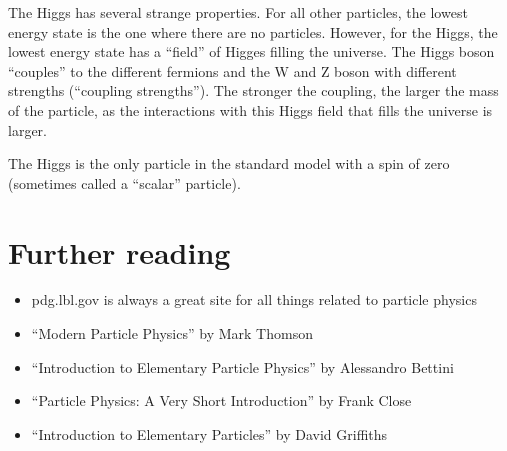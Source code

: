 The Higgs has several strange properties.  For all other particles, the lowest energy state is the one where there are no particles.  However, for the Higgs, the lowest energy state has a ``field'' of Higges filling the universe.  The Higgs boson ``couples'' to the different fermions and the W and Z boson with different strengths (``coupling strengths'').  The stronger the coupling, the larger the mass of the particle, as the interactions with this Higgs field that fills the universe is larger.

The Higgs is the only particle in the standard model with a spin of zero (sometimes called a ``scalar'' particle).

\section{Further reading}
\begin{itemize}
\item pdg.lbl.gov is always a great site for all things related to particle physics
\item ``Modern Particle Physics” by Mark Thomson
\item ``Introduction to Elementary Particle Physics” by Alessandro Bettini
\item ``Particle Physics: A Very Short Introduction'' by Frank Close
\item ``Introduction to Elementary Particles'' by David Griffiths
\end{itemize}



